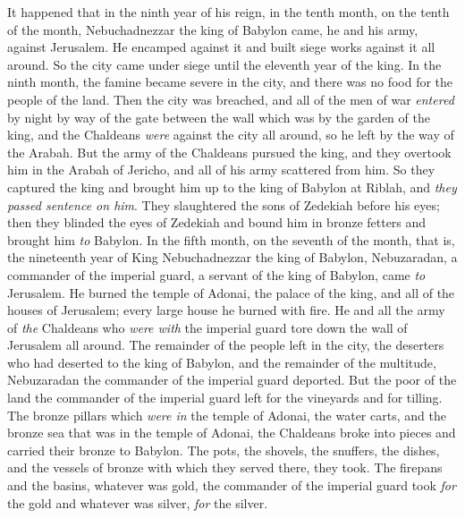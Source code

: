\begin{biblechapter} %
 It happened that in the ninth year of his reign, in the tenth month, on the tenth of the month, Nebuchadnezzar the king of Babylon came, he and his army, against Jerusalem. He encamped against it and built siege works against it all around.
\verse So the city came under siege until the eleventh year of the king.
\verse In the ninth month, the famine became severe in the city, and there was no food for the people of the land.
\verse Then the city was breached, and all of the men of war \textit{entered} by night by way of the gate between the wall which was by the garden of the king, and the Chaldeans \textit{were} against the city all around, so he left by the way of the Arabah.
\verse But the army of the Chaldeans pursued the king, and they overtook him in the Arabah of Jericho, and all of his army scattered from him.
\verse So they captured the king and brought him up to the king of Babylon at Riblah, and \textit{they passed sentence on him}.
\verse They slaughtered the sons of Zedekiah before his eyes; then they blinded the eyes of Zedekiah and bound him in bronze fetters and brought him \textit{to} Babylon.
 In the fifth month, on the seventh of the month, that is, the nineteenth year of King Nebuchadnezzar the king of Babylon, Nebuzaradan, a commander of the imperial guard, a servant of the king of Babylon, came \textit{to} Jerusalem.
\verse He burned the temple of Adonai, the palace of the king, and all of the houses of Jerusalem; every large house he burned with fire.
\verse He and all the army of \textit{the} Chaldeans who \textit{were with} the imperial guard tore down the wall of Jerusalem all around.
\verse The remainder of the people left in the city, the deserters who had deserted to the king of Babylon, and the remainder of the multitude, Nebuzaradan the commander of the imperial guard deported.
\verse But the poor of the land the commander of the imperial guard left for the vineyards and for tilling.
 The bronze pillars which \textit{were in} the temple of Adonai, the water carts, and the bronze sea that was in the temple of Adonai, the Chaldeans broke into pieces and carried their bronze to Babylon.
\verse The pots, the shovels, the snuffers, the dishes, and the vessels of bronze with which they served there, they took.
\verse The firepans and the basins, whatever was gold, the commander of the imperial guard took \textit{for} the gold and whatever was silver, \textit{for} the silver.

\end{biblechapter}

